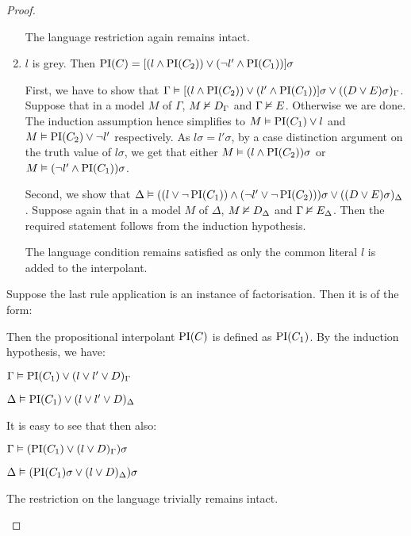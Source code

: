 \begin{proof}
\begin{indproof}
\begin{enumerate}
					The language restriction again remains intact.

				\item $l$ is grey.
					Then $\operatorname{PI}(C) = [(l \land \operatorname{PI}(C_2)) \lor (\lnot l' \land \operatorname{PI}(C_1)) ]\sigma $

					First, we have to show that 
					$ \Gamma \vDash [(l \land \operatorname{PI}(C_2)) \lor (l' \land \operatorname{PI}(C_1)) ]\sigma \lor ((D \lor E)\sigma)_\Gamma$.
					Suppose that in a model $M$ of $\Gamma$, $M \nvDash D_\Gamma$ and $\Gamma \nvDash E$. Otherwise we are done.
					The induction assumption hence simplifies to $M \vDash \operatorname{PI}(C_1) \lor l$ and $M \vDash \operatorname{PI}(C_2) \lor \lnot l'$ respectively.
					As $l\sigma = l'\sigma$, by a case distinction argument on the truth value of $l\sigma$, we get that either $M \vDash (l \land \operatorname{PI}(C_2))\sigma$ or $M \vDash  (\lnot l' \land \operatorname{PI}(C_1))\sigma$.


					Second, we show that 
					$\Delta \vDash ((l \lor \lnot \operatorname{PI}(C_1)) \land (\lnot l' \lor \lnot \operatorname{PI}(C_2)))\sigma \lor ((D \lor E)\sigma)_\Delta$.
					Suppose again that in a model $M$ of $\Delta$, $M \nvDash D_\Delta$ and $\Gamma \nvDash E_\Delta$. 
					Then the required statement follows from the induction hypothesis.

					The language condition remains satisfied as only the common literal $l$ is added to the interpolant.


			\end{enumerate}

			Suppose the last rule application is an instance of factorisation. Then it is of the form:
			\begin{prooftree}
			\end{prooftree}

			Then the propositional interpolant $\operatorname{PI}(C)$ is defined as $\operatorname{PI}(C_1)$.
			By the induction hypothesis, we have:

			$\Gamma \vDash \operatorname{PI}(C_1) \lor (l \lor l' \lor D)_\Gamma$

			$\Delta \vDash \operatorname{PI}(C_1) \lor (l \lor l' \lor D)_\Delta$

			It is easy to see that then also:

			$\Gamma \vDash (\operatorname{PI}(C_1)\lor (l \lor D)_\Gamma)\sigma$

			$\Delta \vDash (\operatorname{PI}(C_1)\sigma \lor (l \lor D)_\Delta)\sigma$

			The restriction on the language trivially remains intact.



\end{indproof}
\end{proof}
